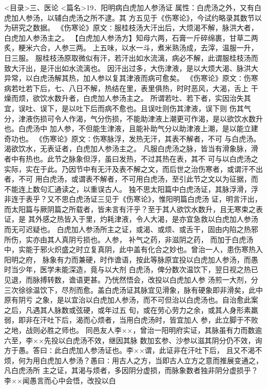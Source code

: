 \documentclass[a4paper,12pt,UTF8,twoside]{ctexbook}
\begin{document}
<目录>三、医论
<篇名>19．阳明病白虎加人参汤证
属性：白虎汤之外，又有白虎加人参汤，以辅白虎汤之所不逮。其 
方五见于《伤寒论》，今试约略录其数节以为研究之数据。 
《伤寒论》原文∶服桂枝汤大汗出后，大烦渴不解，脉洪大者，白虎加人参汤主之。 
【白虎加人参汤方】知母六两，石膏一斤碎绵裹，甘草二两炙，粳米六合，人参三两。 
上五味，以水一斗，煮米熟汤成，去滓，温服一升，日三服。 
服桂枝汤原取微似有汗，若汗出如水流漓，病必不解，此谓服桂枝汤而致大汗出，是汗出如水流漓也。 
因汗出过多，大伤津液，是以大烦大渴、脉洪大异常，以白虎汤解其热，加人参以复其津液而病可愈矣。 
《伤寒论》原文∶伤寒病若吐若下后，七、八日不解，热结在里，表里俱热，时时恶风，大渴，舌上 
干燥而烦，欲饮水数升者，白虎加人参汤主之。 
所谓若吐、若下者，实因治失其宜，误吐、误下，是以吐下后而病不愈也。且误吐则伤其津液，误下则 
伤其气分，津液伤损可令人作渴，气分伤损，不能助津液上潮更可作渴，是以欲饮水数升也。白虎汤中 
加人参，不但能生津液，且能补助气分以助津液上潮，是以能立建奇功也。 
《伤寒论》原文∶伤寒脉浮，发热无汗，其表不解者，不可 
与白虎汤。渴欲饮水，无表证者，白虎加人参汤主之。 
凡服白虎汤之脉，皆当有滑象脉，滑者中有热也。此节之脉象但浮，虽曰发热，不过其热在表，其不 
可与以白虎汤之实际，实在于此。乃因节中有无汗及表不解之文，而后世之治伤寒者，或谓汗不出者，不可 
用白虎汤，或谓表不解者，不可用白虎汤，至引此节之文以为征据，而不能连上数句汇通读之，以重误古人。 
独不思太阳篇中白虎汤证，其脉浮滑，浮非连于表乎？又不思白虎汤证三见于《伤寒论》，惟阳明篇白虎汤 
证，明言汗出，而太阳篇与厥阴篇之所载者，皆未言有汗乎？至于其人欲饮水数升，且无寒束之表证，是 
其外感之热皆入于里，灼耗津液，令人大渴，是亦宜急救以白虎加人参汤而无可迟疑也。 
白虎加人参汤所主之证，或渴、或烦、或舌干，固由内陷之热邪所伤，实亦由其人真阴亏损也。人参， 
补气之药，非滋阴之药， 
而加于白虎汤中，实能于邪火炽盛之时立复真阴，此中盖有化合之妙也。曾治一人，患伤寒热入阳明之府， 
脉象有力而兼硬，时作谵语，按此等脉原宜投以白虎加人参汤，而愚时当少年，医学未能深造，竟与以大剂 
白虎汤，俾分数次温饮下，翌日视之热已见退，而脉搏转数，谵语更甚。乃恍然悟会，改投以白虎加人参 
汤煎一大剂，分三次徐徐温饮下，尽剂而愈。盖白虎汤证其脉宜见滑象，脉有硬象即非滑矣，此中原有阴亏 
之象，是以宜治以白虎加人参汤，而不可但治以白虎汤也。自治愈此案之后，凡遇其人脉数或弦硬，或年过五 
旬，或在劳心劳力之余，或其人身形素羸弱，即非在汗吐下后，渴而心烦者，当用白虎汤时，皆宜加人 
参，此立脚于不败之地，战则必胜之师也。 
同邑友人李××，曾治一阳明府实证，其脉虽有力而数逾六至，李××先投以白虎汤不效，继因其脉 
数加玄参、沙参以滋其阴分仍不效，询方于愚。答曰∶此白虎加人参汤证也。李××谓，此证非在汗吐下后， 
且又不渴不烦，何为用白虎加人参汤？愚曰∶用古人之方，当即古人立方之意而推展变通之，凡白虎汤所 
主之证，其渴与烦者，多因阴分虚损，而脉象数者独非阴分虚损乎？李××闻愚言而心中会悟，改投以白 
\end{document}
